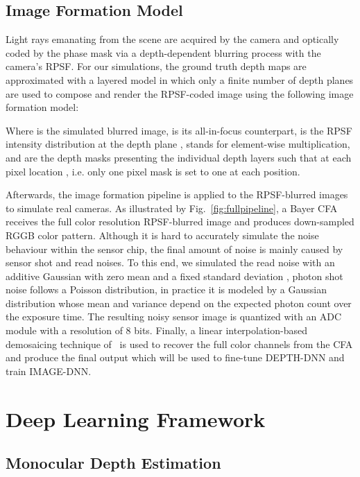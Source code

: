 \documentclass[preprint,5p,twocolumn]{elsarticle}
\begin{document}
\subsection{Image Formation Model}
\label{sec:image_formation}
Light rays emanating  from the scene are acquired by the camera and optically coded by the phase mask via a depth-dependent blurring process with the camera's RPSF. For our simulations, the ground truth depth maps are approximated with a layered model in which only a finite number of depth planes are used to compose and render the RPSF-coded image using the following image formation model:



Where  is the simulated blurred image,  is its all-in-focus counterpart,  is the RPSF intensity distribution at the depth plane ,  stands for element-wise multiplication, and  are the depth masks presenting the individual depth layers such that at each pixel location , i.e. only one pixel mask is set to one at each position. 


Afterwards, the image formation pipeline is applied to the RPSF-blurred images to simulate real cameras. 
As illustrated by Fig.~\ref{fig:fullpipeline}, a Bayer CFA receives the full color resolution RPSF-blurred image and produces down-sampled RGGB color pattern. Although it is hard to accurately simulate the noise behaviour within the sensor chip, the final amount of noise is mainly caused by sensor shot and read noises. To this end, we simulated the read noise with an additive Gaussian  with zero mean and a fixed standard deviation , photon shot noise follows a Poisson distribution, in practice it is modeled by a Gaussian distribution whose mean and variance depend on the expected photon count over the exposure time. The resulting noisy sensor image is quantized with an ADC module with a resolution of 8 bits. Finally, a linear interpolation-based demosaicing technique of~\cite{malvar2004high} is used to recover the full color channels from the CFA and produce the final output which will be used to fine-tune DEPTH-DNN and train IMAGE-DNN.

 
\section{Deep Learning Framework}
\label{sec:learning}


\subsection{Monocular Depth Estimation}
\end{document}
